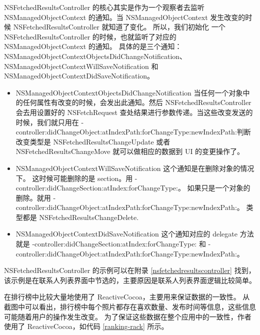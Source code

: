 NSFetchedResultsController 的核心其实是作为一个观察者去监听 NSManagedObjectContext 的通知。当 NSManagedObjectContext 发生改变的时候 NSFetchedResultsController 就知道了变化。
所以，我们初始化 一个NSFetchedResultsController 的时候，也就监听了对应的 NSManagedObjectContext 的通知。
具体的是三个通知：NSManagedObjectContextObjectsDidChangeNotification、NSManagedObjectContextWillSaveNotification 和 NSManagedObjectContextDidSaveNotification。

\begin{itemize}
    \item NSManagedObjectContextObjectsDidChangeNotification
当任何一个对象中的任何属性有改变的时候，会发出此通知。然后 NSFetchedResultsController 会去用设置好的 NSFetchRequest 查处结果进行参数传递。当这些改变发送的时候，我们就只用在 -controller:didChangeObject:atIndexPath:forChangeType:newIndexPath:判断改变类型是 NSFetchedResultsChangeUpdate 或者 NSFetchedResultsChangeMove 就可以做相应的数据到 UI 的变更操作了。
    \item NSManagedObjectContextWillSaveNotification
这个通知是在删除对象的情况下。 这时候可能删除的是 section。用 -controller:\-didChangeSection:\-atIndex:\-forChangeType:。 如果只是一个对象的删除。就用 -controller:\-didChangeObject:\-atIndexPath:\-forChangeType:\-newIndexPath:。
类型都是 NSFetchedResultsChangeDelete.
    \item NSManagedObjectContextDidSaveNotification
这个通知对应的 delegate 方法就是 -controller:\-didChangeSection:\-atIndex:\-forChangeType: 和 -controller:\-didChangeObject:\-atIndexPath:\-forChangeType:\-newIndexPath:。
\end{itemize}

NSFetchedResultsController 的示例可以在附录 \ref{nsfetchedresultscontroller} 找到，该示例是在联系人列表界面中节选的，主要原因是联系人列表界面逻辑比较简单。

在排行榜中比较大量地使用了 ReactiveCocoa，主要用来保证数据的一致性。
从截图中可以看出，排行榜中每个照片都存在喜欢数量、发布时间等信息，这些信息可能随着用户的操作发生改变。
为了保证这些数据在整个应用中的一致性，作者使用了 ReactiveCocoa，如代码 \ref{ranking-rack} 所示。

